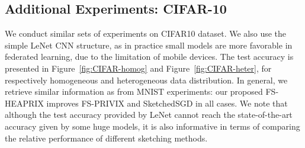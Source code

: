 \documentclass[11pt]{article}
\begin{document}
\subsection{Additional Experiments: CIFAR-10}


We conduct similar sets of experiments on CIFAR10 dataset. We also use the simple LeNet CNN structure, as in practice small models are more favorable in federated learning, due to the limitation of mobile devices. The test accuracy is presented in Figure~\ref{fig:CIFAR-homog} and Figure~\ref{fig:CIFAR-heter}, for respectively homogeneous and heterogeneous data distribution. In general, we retrieve similar information as from MNIST experiments: our proposed FS-HEAPRIX improves FS-PRIVIX and SketchedSGD in all cases. We note that although the test accuracy provided by LeNet cannot reach the state-of-the-art accuracy given by some huge models, it is also informative in terms of comparing the relative performance of different sketching methods.
\end{document}
